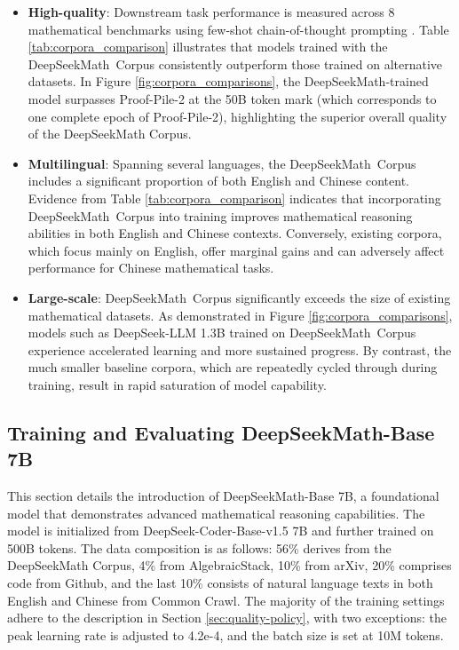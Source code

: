 \begin{itemize}[topsep=0pt]
\begin{itemize}[topsep=0pt]
    \item \textbf{High-quality}:
    Downstream task performance is measured across 8 mathematical benchmarks using few-shot chain-of-thought prompting \cite{cot}. Table \ref{tab:corpora_comparison} illustrates that models trained with the DeepSeekMath~Corpus consistently outperform those trained on alternative datasets. In Figure \ref{fig:corpora_comparisons}, the DeepSeekMath-trained model surpasses Proof-Pile-2 at the 50B token mark (which corresponds to one complete epoch of Proof-Pile-2), highlighting the superior overall quality of the DeepSeekMath Corpus.
    \item \textbf{Multilingual}:
    Spanning several languages, the DeepSeekMath~Corpus includes a significant proportion of both English and Chinese content. Evidence from Table \ref{tab:corpora_comparison} indicates that incorporating DeepSeekMath~Corpus into training improves mathematical reasoning abilities in both English and Chinese contexts. Conversely, existing corpora, which focus mainly on English, offer marginal gains and can adversely affect performance for Chinese mathematical tasks.
    \item \textbf{Large-scale}:
    DeepSeekMath~Corpus significantly exceeds the size of existing mathematical datasets. As demonstrated in Figure \ref{fig:corpora_comparisons}, models such as DeepSeek-LLM 1.3B trained on DeepSeekMath~Corpus experience accelerated learning and more sustained progress. By contrast, the much smaller baseline corpora, which are repeatedly cycled through during training, result in rapid saturation of model capability.
\end{itemize}

\subsection{Training and Evaluating DeepSeekMath-Base 7B}

This section details the introduction of DeepSeekMath-Base 7B, a foundational model that demonstrates advanced mathematical reasoning capabilities. The model is initialized from DeepSeek-Coder-Base-v1.5 7B \citep{deepseek-coder} and further trained on 500B tokens. The data composition is as follows: 56\% derives from the DeepSeekMath Corpus, 4\% from AlgebraicStack, 10\% from arXiv, 20\% comprises code from Github, and the last 10\% consists of natural language texts in both English and Chinese from Common Crawl. The majority of the training settings adhere to the description in Section \ref{sec:quality-policy}, with two exceptions: the peak learning rate is adjusted to 4.2e-4, and the batch size is set at 10M tokens.


\end{itemize}
